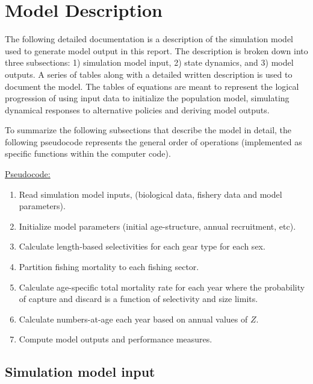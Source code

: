 
\section{Model Description} %
\label{sec:model_description}

The following detailed documentation is a description of the simulation model used to generate model output in this report.  The description is broken down into three subsections: 1) simulation model input, 2) state dynamics, and 3) model outputs.  A series of tables along with a detailed written description is used to document the model.  The tables of equations are meant to represent the logical progression of using input data to initialize the population model, simulating dynamical responses to alternative policies and deriving model outputs.

To summarize the following subsections that describe the model in detail, the following pseudocode represents the general order of operations (implemented as specific functions within the computer code).

\noindent\underline{Pseudocode:}
\begin{enumerate}
	\item Read simulation model inputs, (biological data, fishery data and model parameters).
	\item Initialize model parameters (initial age-structure, annual recruitment, etc).
	\item Calculate length-based selectivities for each gear type for each sex.
	\item Partition fishing mortality to each fishing sector.
	\item Calculate age-specific total mortality rate for each year where the probability of capture and discard is a function of selectivity and size limits.
	\item Calculate numbers-at-age each year based on annual values of $Z$.
	\item Compute model outputs and performance measures.
\end{enumerate}

\subsection{Simulation model input} %
\label{sub:simulation_model_input}

